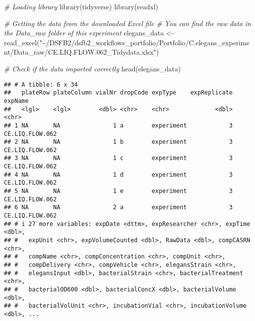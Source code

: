 \documentclass[
]{book}
\newenvironment{Shaded}{\begin{snugshade}}{\end{snugshade}}
\newcommand{\CommentTok}[1]{\textcolor[rgb]{0.56,0.35,0.01}{\textit{#1}}}
\newcommand{\FunctionTok}[1]{\textcolor[rgb]{0.00,0.00,0.00}{#1}}
\newcommand{\NormalTok}[1]{#1}
\newcommand{\OtherTok}[1]{\textcolor[rgb]{0.56,0.35,0.01}{#1}}
\newcommand{\SpecialCharTok}[1]{\textcolor[rgb]{0.00,0.00,0.00}{#1}}
\newcommand{\StringTok}[1]{\textcolor[rgb]{0.31,0.60,0.02}{#1}}
\begin{document}
\begin{Shaded}
\begin{Highlighting}[]
\CommentTok{\# Loading library}
\FunctionTok{library}\NormalTok{(tidyverse)}
\FunctionTok{library}\NormalTok{(readxl)}

\CommentTok{\# Getting the data from the downloaded Excel file}
\CommentTok{\# You can find the raw data in the Data\_raw folder of this experiment}
\NormalTok{elegans\_data }\OtherTok{\textless{}{-}} \FunctionTok{read\_excel}\NormalTok{(}\StringTok{"\textasciitilde{}/DSFB2/dsfb2\_workflows\_portfolio/Portfolio/C.elegans\_experiment/Data\_raw/CE.LIQ.FLOW.062\_Tidydata.xlsx"}\NormalTok{)}

\CommentTok{\# Check if the data imported correctly}
\FunctionTok{head}\NormalTok{(elegans\_data)}
\end{Highlighting}
\end{Shaded}

\begin{verbatim}
## # A tibble: 6 x 34
##   plateRow plateColumn vialNr dropCode expType    expReplicate expName        
##   <lgl>    <lgl>        <dbl> <chr>    <chr>             <dbl> <chr>          
## 1 NA       NA               1 a        experiment            3 CE.LIQ.FLOW.062
## 2 NA       NA               1 b        experiment            3 CE.LIQ.FLOW.062
## 3 NA       NA               1 c        experiment            3 CE.LIQ.FLOW.062
## 4 NA       NA               1 d        experiment            3 CE.LIQ.FLOW.062
## 5 NA       NA               1 e        experiment            3 CE.LIQ.FLOW.062
## 6 NA       NA               2 a        experiment            3 CE.LIQ.FLOW.062
## # i 27 more variables: expDate <dttm>, expResearcher <chr>, expTime <dbl>,
## #   expUnit <chr>, expVolumeCounted <dbl>, RawData <dbl>, compCASRN <chr>,
## #   compName <chr>, compConcentration <chr>, compUnit <chr>,
## #   compDelivery <chr>, compVehicle <chr>, elegansStrain <chr>,
## #   elegansInput <dbl>, bacterialStrain <chr>, bacterialTreatment <chr>,
## #   bacterialOD600 <dbl>, bacterialConcX <dbl>, bacterialVolume <dbl>,
## #   bacterialVolUnit <chr>, incubationVial <chr>, incubationVolume <dbl>, ...
\end{verbatim}

\begin{Shaded}
\end{Shaded}
\end{document}
